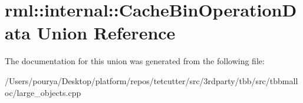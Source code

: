 \hypertarget{unionrml_1_1internal_1_1CacheBinOperationData}{}\section{rml\+:\+:internal\+:\+:Cache\+Bin\+Operation\+Data Union Reference}
\label{unionrml_1_1internal_1_1CacheBinOperationData}


The documentation for this union was generated from the following file\+:\begin{DoxyCompactItemize}
\item 
/\+Users/pourya/\+Desktop/platform/repos/tetcutter/src/3rdparty/tbb/src/tbbmalloc/large\+\_\+objects.\+cpp\end{DoxyCompactItemize}
